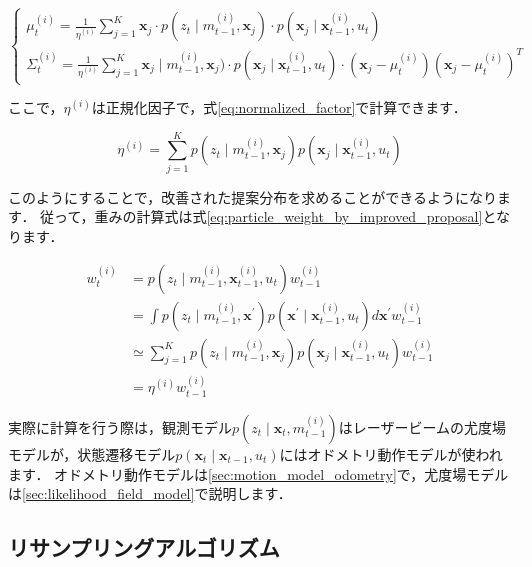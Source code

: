 \documentclass[{../../master}]{subfiles}
\begin{document}
\begin{equation}
  \begin{cases}
    \mu_{t}^{(i)} = \frac{1}{\eta^{(i)}} \sum_{j = 1}^{K} \bm{x}_{j} \cdot p(z_{t} \mid m_{t-1}^{(i)}, \bm{x}_{j}) \cdot p(\bm{x}_{j} \mid \bm{x}_{t-1}^{(i)}, u_{t}) \\
    \Sigma_{t}^{(i)} = \frac{1}{\eta^{(i)}} \sum_{j = 1}^{K}\bm{x}_{j} \mid m_{t-1}^{(i)}, \bm{x}_{j}) \cdot p(\bm{x}_{j} \mid \bm{x}_{t-1}^{(i)}, u_{t}) \cdot (\bm{x}_{j} - \mu_{t}^{(i)})(\bm{x}_{j} - \mu_{t}^{(i)})^{T}
  \end{cases}
  \label{eq:mean_and_covariance}
\end{equation}

\noindent
ここで，$\eta^{(i)}$は正規化因子で，式\ref{eq:normalized_factor}で計算できます．

\begin{equation}
  \eta^{(i)} = \sum_{j=1}^{K} p(z_{t} \mid m_{t-1}^{(i)}, \bm{x}_{j}) p(\bm{x}_{j} \mid \bm{x}_{t-1}^{(i)}, u_{t})
  \label{eq:normalized_factor}
\end{equation}

このようにすることで，改善された提案分布を求めることができるようになります．
従って，重みの計算式は式\ref{eq:particle_weight_by_improved_proposal}となります．

\begin{equation}
  \begin{split}
    w_{t}^{(i)} &= p(z_{t} \mid m_{t-1}^{(i)}, \bm{x}_{t-1}^{(i)}, u_{t}) w_{t-1}^{(i)} \\
    &= \int p(z_{t} \mid m_{t-1}^{(i)}, \bm{x}^{\prime})p(\bm{x}^{\prime} \mid \bm{x}_{t-1}^{(i)}, u_{t})d\bm{x}^{\prime} w_{t-1}^{(i)}\\
    &\simeq \sum_{j=1}^{K} p(z_{t} \mid m_{t-1}^{(i)}, \bm{x}_{j}) p(\bm{x}_{j} \mid \bm{x}_{t-1}^{(i)}, u_{t}) w_{t-1}^{(i)} \\
    &= \eta^{(i)} w_{t-1}^{(i)}
  \end{split}
  \label{eq:particle_weight_by_improved_proposal}
\end{equation}

実際に計算を行う際は，観測モデル$p(z_{t} \mid \bm{x}_{t}, m_{t-1}^{(i)})$はレーザービームの尤度場モデルが，状態遷移モデル$p(\bm{x}_{t} \mid \bm{x}_{t-1}, u_{t})$にはオドメトリ動作モデルが使われます．
オドメトリ動作モデルは\ref{sec:motion_model_odometry}で，尤度場モデルは\ref{sec:likelihood_field_model}で説明します．

\subsection{リサンプリングアルゴリズム}
\end{document}
